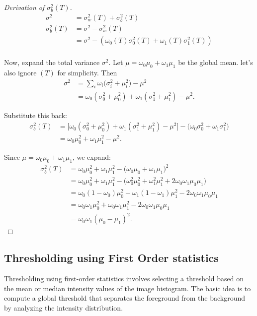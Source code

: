 \begin{proof}[Derivation of \(\sigma_b^2(T)\)]
  
\begin{align*}
  \sigma^2 & = \sigma_w^2(T) + \sigma_b^2(T) \\
  \sigma_b^2(T) & = \sigma^2 - \sigma_w^2(T)\\
  &= \sigma^2 - \left( \omega_0(T) \sigma_0^2(T) + \omega_1(T) \sigma_1^2(T) \right)\\
\end{align*}

Now, expand the total variance \(\sigma^2\).  
Let \(\mu = \omega_0\mu_0 + \omega_1\mu_1\) be the global mean. 
let's also ignore $(T)$ for simplicity.
Then
\begin{align*}
  \sigma^2 &= \sum_{i} \omega_i \big(\sigma_i^2 + \mu_i^2\big) - \mu^2 \\[6pt]
           &= \omega_0(\sigma_0^2 + \mu_0^2) + \omega_1(\sigma_1^2 + \mu_1^2) - \mu^2.
\end{align*}

Substitute this back:
\begin{align*}
  \sigma_b^2(T)
  &= \Big[\omega_0(\sigma_0^2 + \mu_0^2) + \omega_1(\sigma_1^2 + \mu_1^2) - \mu^2\Big]
     - \Big(\omega_0\sigma_0^2 + \omega_1\sigma_1^2\Big) \\[6pt]
  &= \omega_0\mu_0^2 + \omega_1\mu_1^2 - \mu^2.
\end{align*}

Since \(\mu = \omega_0\mu_0 + \omega_1\mu_1\), we expand:
\begin{align*}
  \sigma_b^2(T)
  &= \omega_0\mu_0^2 + \omega_1\mu_1^2 - \big(\omega_0\mu_0 + \omega_1\mu_1\big)^2 \\[6pt]
  &= \omega_0\mu_0^2 + \omega_1\mu_1^2
     - \big(\omega_0^2\mu_0^2 + \omega_1^2\mu_1^2 + 2\omega_0\omega_1\mu_0\mu_1\big) \\[6pt]
  &= \omega_0(1-\omega_0)\mu_0^2 + \omega_1(1-\omega_1)\mu_1^2 - 2\omega_0\omega_1\mu_0\mu_1 \\[6pt]
  &= \omega_0\omega_1\mu_0^2 + \omega_0\omega_1\mu_1^2 - 2\omega_0\omega_1\mu_0\mu_1 \\[6pt]
  &= \omega_0\omega_1(\mu_0 - \mu_1)^2.
\end{align*}
  
\end{proof}

\subsection{Thresholding using First Order statistics}
Thresholding using first-order statistics involves selecting a threshold based on the mean or median intensity values of the image histogram. The basic idea is to compute a global threshold that separates the foreground from the background by analyzing the intensity distribution.

